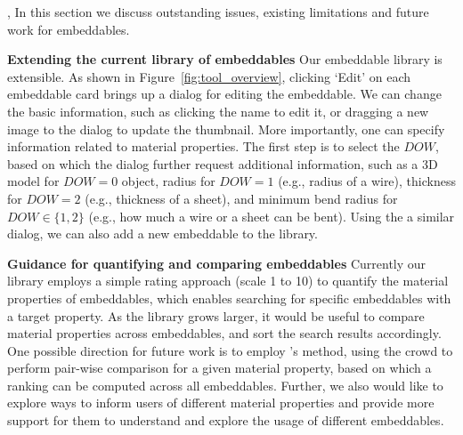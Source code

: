 

,
In this section we discuss outstanding issues, existing limitations and future work for embeddables.

\textbf{Extending the current library of embeddables}
Our embeddable library is extensible. As shown in Figure~\ref{fig:tool_overview}, clicking `Edit' on each embeddable card brings up a dialog for editing the embeddable. We can change the basic information, such as clicking the name to edit it, or dragging a new image to the dialog to update the thumbnail. More importantly, one can specify information related to material properties. The first step is to select the $DOW$, based on which the dialog further request additional information, such as a 3D model for $DOW=0$ object, radius for $DOW=1$ (e.g., radius of a wire), thickness for $DOW=2$ (e.g., thickness of a sheet), and minimum bend radius for $DOW \in \{1, 2\}$ (e.g., how much a wire or a sheet can be bent).
Using the a similar dialog, we can also add a new embeddable to the library.




\textbf{Guidance for quantifying and comparing embeddables}
Currently our library employs a simple rating approach (scale 1 to 10) to quantify the material properties of embeddables, which enables searching for specific embeddables with a target property. As the library grows larger, it would be useful to compare material properties across embeddables, and sort the search results accordingly. One possible direction for future work is to employ \cite{yumer2015semantic}'s method, using the crowd to perform pair-wise comparison for a given material property, based on which a ranking can be computed across all embeddables. Further, we also would like to explore ways to inform users of different material properties and provide more support for them to understand and explore the usage of different embeddables.

